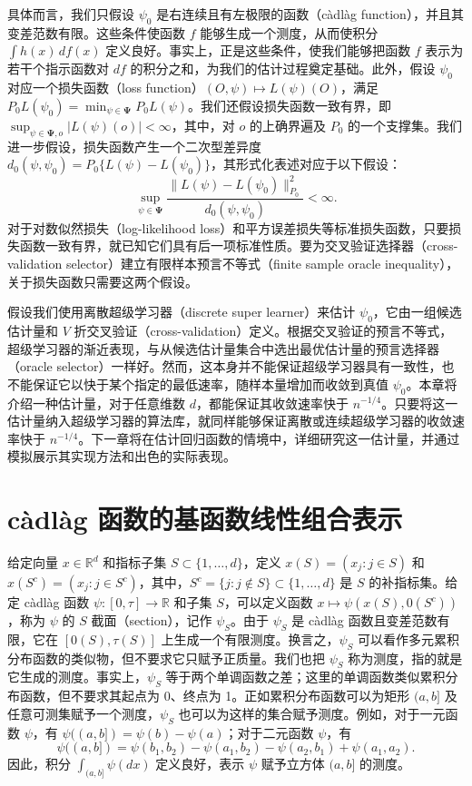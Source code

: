 具体而言，我们只假设 $\psi_0$ 是右连续且有左极限的函数（càdlàg function），并且其变差范数有限。这些条件使函数 $f$ 能够生成一个测度，从而使积分 $\int h(x)\,df(x)$ 定义良好。事实上，正是这些条件，使我们能够把函数 $f$ 表示为若干个指示函数对 $df$ 的积分之和，为我们的估计过程奠定基础。此外，假设 $\psi_0$ 对应一个损失函数（loss function）$(O,\psi)\mapsto L(\psi)(O)$，满足 $P_0L(\psi_0)=\min_{\psi\in\boldsymbol{\Psi}}P_0L(\psi)$。我们还假设损失函数一致有界，即 $\sup_{\psi\in\boldsymbol{\Psi},o}|L(\psi)(o)|<\infty$，其中，对 $o$ 的上确界遍及 $P_0$ 的一个支撑集。我们进一步假设，损失函数产生一个二次型差异度 $d_0(\psi,\psi_0)=P_0\{L(\psi)-L(\psi_0)\}$，其形式化表述对应于以下假设：
\[
 \sup_{\psi\in\boldsymbol{\Psi}}
 \frac{\|L(\psi)-L(\psi_0)\|_{P_0}^2}{d_0(\psi,\psi_0)}<\infty.
\]
对于对数似然损失（log-likelihood loss）和平方误差损失等标准损失函数，只要损失函数一致有界，就已知它们具有后一项标准性质。要为交叉验证选择器（cross-validation selector）建立有限样本预言不等式（finite sample oracle inequality），关于损失函数只需要这两个假设。

\begin{sourcebox}
假设我们使用离散超级学习器（discrete super learner）来估计 $\psi_0$，它由一组候选估计量和 $V$ 折交叉验证（cross-validation）定义。根据交叉验证的预言不等式，超级学习器的渐近表现，与从候选估计量集合中选出最优估计量的预言选择器（oracle selector）一样好。然而，这本身并不能保证超级学习器具有一致性，也不能保证它以快于某个指定的最低速率，随样本量增加而收敛到真值 $\psi_0$。本章将介绍一种估计量，对于任意维数 $d$，都能保证其收敛速率快于 $n^{-1/4}$。只要将这一估计量纳入超级学习器的算法库，就同样能够保证离散或连续超级学习器的收敛速率快于 $n^{-1/4}$。下一章将在估计回归函数的情境中，详细研究这一估计量，并通过模拟展示其实现方法和出色的实际表现。
\end{sourcebox}

\section{càdlàg 函数的基函数线性组合表示}
\label{sec:ch06-cadlag-representation}

给定向量 $x\in\mathbb R^d$ 和指标子集 $S\subset\{1,\ldots,d\}$，定义 $x(S)=(x_j:j\in S)$ 和 $x(S^c)=(x_j:j\in S^c)$，其中，$S^c=\{j:j\notin S\}\subset\{1,\ldots,d\}$ 是 $S$ 的补指标集。给定 càdlàg 函数 $\psi:[0,\tau]\to\mathbb R$ 和子集 $S$，可以定义函数 $x\mapsto\psi(x(S),0(S^c))$，称为 $\psi$ 的 $S$ 截面（section），记作 $\psi_S$。由于 $\psi_S$ 是 càdlàg 函数且变差范数有限，它在 $[0(S),\tau(S)]$ 上生成一个有限测度。换言之，$\psi_S$ 可以看作多元累积分布函数的类似物，但不要求它只赋予正质量。我们也把 $\psi_S$ 称为测度，指的就是它生成的测度。事实上，$\psi_S$ 等于两个单调函数之差；这里的单调函数类似累积分布函数，但不要求其起点为 0、终点为 1。正如累积分布函数可以为矩形 $(a,b]$ 及任意可测集赋予一个测度，$\psi_S$ 也可以为这样的集合赋予测度。例如，对于一元函数 $\psi$，有 $\psi((a,b])=\psi(b)-\psi(a)$；对于二元函数 $\psi$，有
\[
 \psi((a,b])=\psi(b_1,b_2)-\psi(a_1,b_2)-\psi(a_2,b_1)+\psi(a_1,a_2).
\]
因此，积分 $\int_{(a,b]}\psi(dx)$ 定义良好，表示 $\psi$ 赋予立方体 $(a,b]$ 的测度。

